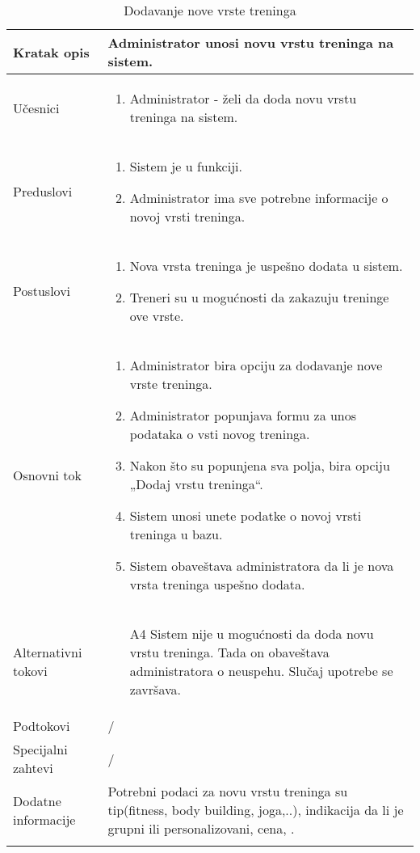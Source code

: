 \documentclass[../main.tex]{subfiles}
\begin{document}
\begin{longtable}{| p{} | p{} |} 

\hline
    Kratak opis &  Administrator unosi novu vrstu treninga na sistem.\\ 
\hline    
    Učesnici & 
    	\begin{enumerate}
        \item Administrator - želi da doda novu vrstu treninga na sistem.
     \end{enumerate}\\
\hline
   Preduslovi & \begin{enumerate}
       \item Sistem je u funkciji.
       \item Administrator ima sve potrebne informacije o novoj vrsti treninga.
   \end{enumerate}\\
\hline  
    Postuslovi & \begin{enumerate}
        \item Nova vrsta treninga je uspešno dodata u sistem.
        \item Treneri su u mogućnosti da zakazuju treninge ove vrste.
    \end{enumerate}\\
\hline
    Osnovni tok & \begin{enumerate}
        \item Administrator bira opciju za dodavanje nove vrste treninga.
        \item Administrator popunjava formu za unos podataka o vsti novog treninga.
        \item Nakon što su popunjena sva polja, bira opciju „Dodaj vrstu treninga“.
        \item Sistem unosi unete podatke o novoj vrsti treninga u bazu.
        \item Sistem obaveštava administratora da li je nova vrsta treninga uspešno dodata.
    \end{enumerate}\\
\hline
    Alternativni tokovi & \begin{itemize}
        \item[A4]  Sistem nije u mogućnosti da doda novu vrstu treninga. Tada on obaveštava administratora o neuspehu. Slučaj upotrebe se završava.

    \end{itemize}\\
\hline
    Podtokovi & /\\
\hline
    Specijalni zahtevi & /\\
\hline
    Dodatne informacije & Potrebni podaci za novu vrstu treninga su tip(fitness, body building, joga,..), indikacija da li je grupni ili personalizovani, cena, .\\
\hline
\caption{Dodavanje nove vrste treninga} %
\end{longtable}
\end{document}
